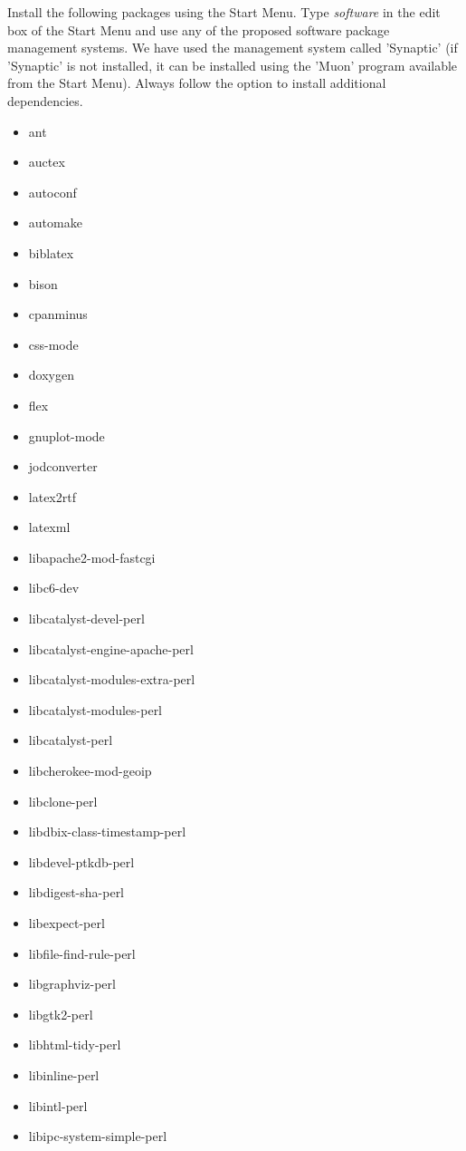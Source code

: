 \documentclass[12pt]{article}
\begin{document}
Install the following packages using the Start Menu.  Type
  {\it software} in the edit box of the Start Menu and use any of the
  proposed software package management systems.  We have used the
  management system called 'Synaptic' (if 'Synaptic' is not installed,
  it can be installed using the 'Muon' program available from the
  Start Menu).  Always follow the option to install additional
  dependencies.
  \begin{itemize}
  \item ant
  \item auctex
  \item autoconf
  \item automake
  \item biblatex
  \item bison
  \item cpanminus
  \item css-mode
  \item doxygen
  \item flex
  \item gnuplot-mode
  \item jodconverter
  \item latex2rtf
  \item latexml
  \item libapache2-mod-fastcgi
  \item libc6-dev
  \item libcatalyst-devel-perl
  \item libcatalyst-engine-apache-perl
  \item libcatalyst-modules-extra-perl
  \item libcatalyst-modules-perl
  \item libcatalyst-perl
  \item libcherokee-mod-geoip
  \item libclone-perl
  \item libdbix-class-timestamp-perl
  \item libdevel-ptkdb-perl
  \item libdigest-sha-perl
  \item libexpect-perl
  \item libfile-find-rule-perl
  \item libgraphviz-perl
  \item libgtk2-perl
  \item libhtml-tidy-perl
  \item libinline-perl
  \item libintl-perl
  \item libipc-system-simple-perl

\end{itemize}
\end{document}
